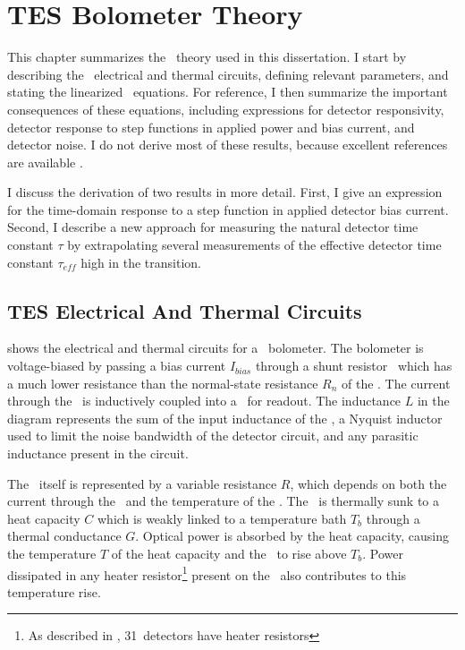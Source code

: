 \chapter{\textsc{TES} Bolometer Theory}\label{c:tes}


This chapter summarizes the \TES\ theory used in this dissertation.
I start by describing the \TES\ electrical and thermal circuits, defining relevant parameters, and stating the linearized \TES\ equations.
For reference, I then summarize the important consequences of these equations, including expressions for detector responsivity, detector response to step functions in applied power and bias current, and detector noise.
I do not derive most of these results, because excellent references are available \cite{irwin_application_1995,irwin_transition-edge_2005, mather_bolometer_1982}.

I discuss the derivation of two results in more detail.
First, I give an expression for the time-domain response to a step function in applied detector bias current.
Second, I describe a new approach for measuring the natural detector time constant $\tau$ by extrapolating several measurements of the effective detector time constant $\tau_{eff}$ high in the transition. 

\section{\textsc{TES} Electrical And Thermal Circuits} \label{sec:ch3-circuits}

 shows the electrical and thermal circuits for a \TES\ bolometer.
The bolometer is voltage-biased by passing a bias current $I_{bias}$ through a shunt resistor \Rsh\ which has a much lower resistance than the normal-state resistance $R_n$ of the \TES.
The current through the \TES\ is inductively coupled into a \SQUID\ for readout.
The inductance $L$ in the diagram represents the sum of the input inductance of the \SQUID, a Nyquist inductor used to limit the noise bandwidth of the detector circuit, and any parasitic inductance present in the circuit.

The \TES\ itself is represented by a variable resistance $R$, which depends on both the current through the \TES\ and the temperature of the \TES.
The \TES\ is thermally sunk to a heat capacity $C$ which is weakly linked to a temperature bath $T_b$ through a thermal conductance $G$.
Optical power is absorbed by the heat capacity, causing the temperature $T$ of the heat capacity and the \TES\ to rise above $T_b$.
Power dissipated in any heater resistor\footnote{As described in , 31~detectors have heater resistors} present on the \TES\ also contributes to this temperature rise.

